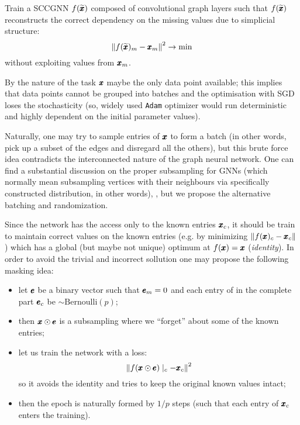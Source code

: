 \documentclass{mynotes}
\begin{document}
\begin{problem}
      Train a SCCGNN \( f(\widetilde{\pmb{x}})\) composed of convolutional graph layers such that \( f(\widetilde{\pmb{x}} )\) reconstructs the correct dependency on the missing values due to simplicial structure: 
      \begin{equation}
            \left\| f(\widetilde{\pmb{x}})_m - \pmb{x}_m  \right\|^2 \to \min
      \end{equation}
      without exploiting values from \( \pmb{x}_m \).
\end{problem}

\begin{remark}
      By the nature of the task \( \pmb{x} \) maybe the only data point available; this implies that data points cannot be grouped into batches and the optimisation with SGD loses the stochasticity (so, widely used \texttt{Adam} optimizer would run deterministic and highly dependent on the initial parameter values). 

      Naturally, one may try to sample entries of \( \pmb{x} \) to form a batch (in other words, pick up a subset of the edges and disregard all the others), but this brute force idea contradicts the interconnected nature of the graph neural network. One can find a substantial discussion on the proper subsampling for GNNs (which normally mean subsampling vertices with their neighbours via specifically constructed distribution, in other words), \cite{huBatchsizeSelectionStochastic2020}, but we propose the alternative batching and randomization.

      Since the network has the access only to the known entries \( \pmb{x}_c\), it should be train to maintain correct values on the known entries (e.g. by minimizing \( \| f(\pmb{x} )_c - \pmb{x}_c \| \)) which has a global (but maybe not unique) optimum at \( f( \pmb{x}) = \pmb{x} \) (\emph{identity}). In order to avoid the trivial and incorrect sollution one may propose the following masking idea:
      \begin{itemize}
            \item let \( \pmb{e} \) be a binary vector such that \( \pmb{e}_m = 0 \) and each entry of in the complete part \( \pmb{e}_c \) be \( \sim \mathrm{Bernoulli} \left( p \right) \);
            \item then \( \pmb{x} \odot \pmb{e} \) is a subsampling where we ``forget'' about some of the known entries;
            \item let us train the network with a loss:
            \begin{equation}
                  \left\| f( \pmb{x} \odot \pmb{e} )\mid_c - \pmb{x}_c \right\|^2 
            \end{equation}
            so it avoids the identity and tries to keep the original known values intact;
            \item then the epoch is naturally formed by \( 1/p \) steps (such that each entry of \( \pmb{x}_c \) enters the training).
      \end{itemize}
\end{remark}
\end{document}
